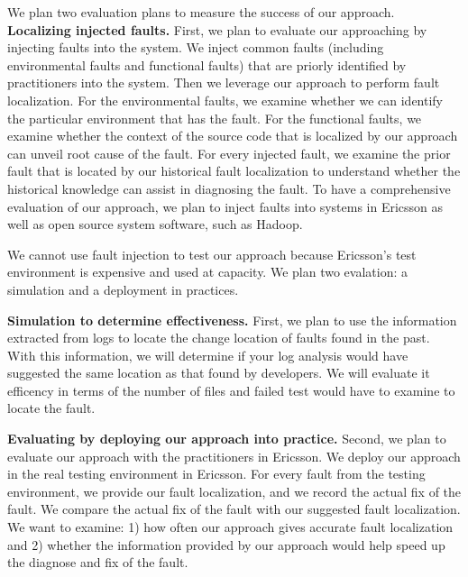 We plan two evaluation plans to measure the success of our approach. 
\noindent \textbf{Localizing injected faults.} First, we plan to evaluate our approaching by injecting faults into the system. We inject common faults (including environmental faults and functional faults) that are priorly identified by practitioners into the system. Then we leverage our approach to perform fault localization. For the environmental faults, we examine whether we can identify the particular environment that has the fault. For the functional faults, we examine whether the context of the source code that is localized by our approach can unveil root cause of the fault. For every injected fault, we examine the prior fault that is located by our historical fault localization to understand whether the historical knowledge can assist in diagnosing the fault. To have a comprehensive evaluation of our approach, we plan to inject faults into systems in Ericsson as well as open source system software, such as Hadoop.

We cannot use fault injection to test our approach because Ericsson's test environment is expensive and used at capacity. We plan two evalation: a simulation and a deployment in practices.

\noindent \textbf{Simulation to determine effectiveness.} First, we plan to use the information extracted from logs to locate the change location of faults found in the past. With this information, we will determine if your log analysis would have suggested the same location as that found by developers. We will evaluate it efficency in terms of the number of files and failed test would have to examine to locate the fault.
 
\noindent \textbf{Evaluating by deploying our approach into practice.} Second, we plan to evaluate our approach with the practitioners in Ericsson. We deploy our approach in the real testing environment in Ericsson. For every fault from the testing environment, we provide our fault localization, and we record the actual fix of the fault. We compare the actual fix of the fault with our suggested fault localization. We want to examine: 1) how often our approach gives accurate fault localization and 2) whether the information provided by our approach would help speed up the diagnose and fix of the fault.


